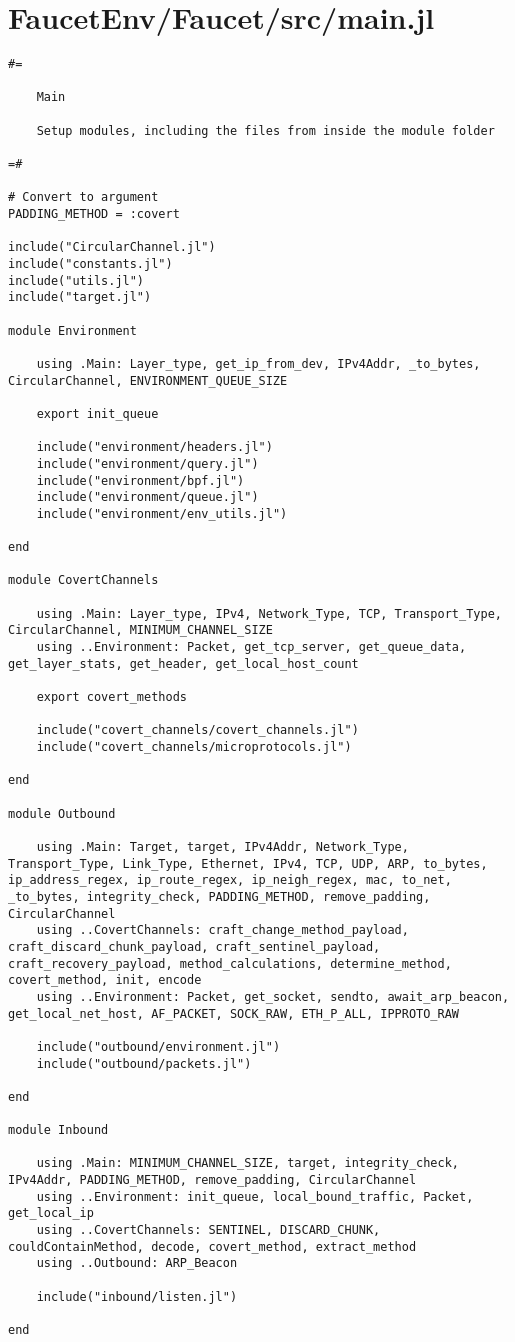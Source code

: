 \section{FaucetEnv/Faucet/src/main.jl}
\begin{lstlisting}[language=JuliaLocal, style=julia]
#=

    Main

    Setup modules, including the files from inside the module folder

=#

# Convert to argument
PADDING_METHOD = :covert

include("CircularChannel.jl")
include("constants.jl")
include("utils.jl")
include("target.jl")

module Environment

    using .Main: Layer_type, get_ip_from_dev, IPv4Addr, _to_bytes, CircularChannel, ENVIRONMENT_QUEUE_SIZE
    
    export init_queue

    include("environment/headers.jl")
    include("environment/query.jl")
    include("environment/bpf.jl")
    include("environment/queue.jl")
    include("environment/env_utils.jl")

end

module CovertChannels

    using .Main: Layer_type, IPv4, Network_Type, TCP, Transport_Type, CircularChannel, MINIMUM_CHANNEL_SIZE
    using ..Environment: Packet, get_tcp_server, get_queue_data, get_layer_stats, get_header, get_local_host_count

    export covert_methods

    include("covert_channels/covert_channels.jl")
    include("covert_channels/microprotocols.jl")
    
end

module Outbound

    using .Main: Target, target, IPv4Addr, Network_Type, Transport_Type, Link_Type, Ethernet, IPv4, TCP, UDP, ARP, to_bytes, ip_address_regex, ip_route_regex, ip_neigh_regex, mac, to_net, _to_bytes, integrity_check, PADDING_METHOD, remove_padding, CircularChannel
    using ..CovertChannels: craft_change_method_payload, craft_discard_chunk_payload, craft_sentinel_payload, craft_recovery_payload, method_calculations, determine_method, covert_method, init, encode
    using ..Environment: Packet, get_socket, sendto, await_arp_beacon, get_local_net_host, AF_PACKET, SOCK_RAW, ETH_P_ALL, IPPROTO_RAW

    include("outbound/environment.jl")
    include("outbound/packets.jl")

end

module Inbound

    using .Main: MINIMUM_CHANNEL_SIZE, target, integrity_check, IPv4Addr, PADDING_METHOD, remove_padding, CircularChannel
    using ..Environment: init_queue, local_bound_traffic, Packet, get_local_ip
    using ..CovertChannels: SENTINEL, DISCARD_CHUNK, couldContainMethod, decode, covert_method, extract_method
    using ..Outbound: ARP_Beacon

    include("inbound/listen.jl")

end

\end{lstlisting}